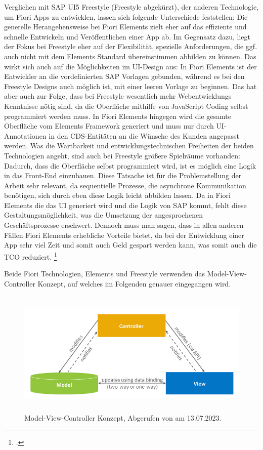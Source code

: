 Verglichen mit SAP UI5 Freestyle (Freestyle abgekürzt), der anderen Technologie, um Fiori Apps zu entwicklen, lassen sich folgende Unterschiede feststellen: Die generelle Herangehensweise bei Fiori Elements zielt eher auf das effiziente und schnelle Entwickeln und Veröffentlichen einer App ab. Im Gegensatz dazu, liegt der Fokus bei Freestyle eher auf der Flexibilität, spezielle Anforderungen, die ggf. auch nicht mit dem Elements Standard übereinstimmen abbilden zu können. Das wirkt sich auch auf die Möglichkeiten im UI-Design aus: In Fiori Elements ist der Entwickler an die vordefinierten SAP Vorlagen gebunden, während es bei den Freestyle Designs auch möglich ist, mit einer leeren Vorlage zu beginnen. Das hat aber auch zur Folge, dass bei Freestyle wesentlich mehr Webentwicklungs Kenntnisse nötig sind, da die Oberfläche mithilfe von JavaScript Coding selbst programmiert werden muss. In Fiori Elements hingegen wird die gesamte Oberfläche vom Elements Framework generiert und muss nur durch UI-Annotationen in den CDS-Entitäten an die Wünsche des Kunden angepasst werden. Was die Wartbarkeit und entwicklungstechnischen Freiheiten der beiden Technologien angeht, sind auch bei Freestyle grö{\ss}ere Spielräume vorhanden: Dadurch, dass die Oberfläche selbst programmiert wird, ist es möglich eine Logik in das Front-End einzubauen. Diese Tatsache ist für die Problemstellung der Arbeit sehr relevant, da sequentielle Prozesse, die asynchrone Kommunikation benötigen, sich durch eben diese Logik leicht abbilden lassen. Da in Fiori Elements die das UI generiert wird und die Logik von SAP kommt, fehlt diese Gestaltungsmöglichkeit, was die Umsetzung der angesprochenen Geschäftsprozesse erschwert. Dennoch muss man sagen, dass in allen anderen Fällen Fiori Elements erhebliche Vorteile bietet, da bei der Entwicklung einer App sehr viel Zeit und somit auch Geld gespart werden kann, was somit auch die TCO reduziert. \footcite[Vgl.][]{sap_ui5-freestyle-elements-image_2023}

Beide Fiori Technologien, Elements und Freestyle verwenden das Model-View-Controller Konzept, auf welches im Folgenden genauer eingegangen wird.
\begin{figure}[H]
    \centering
    \includegraphics[height=6cm]{Bilder/Fiori_Model-View-Controller-Konzept.png}
    \caption[Model-View-Controller Konzept]{Model-View-Controller Konzept, Abgerufen von \cite{sap_sapui5-sap-hel-docu_2023} am 13.07.2023.}
    \label{fig:iso_norm}
\end{figure}

